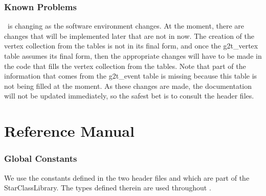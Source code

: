 
\section{Known Problems} 

\StMcEvent\ is changing as the software environment changes.  At the moment,
there are changes that will be implemented later that are not in now.
The creation of the vertex collection from the tables is not in its final
form, and once the g2t\_vertex table assumes its final form, then the appropriate
changes will have to be made in the code that fills the vertex collection from
the tables.  Note that part of the information that comes from the g2t\_event
table is missing because this table is not being filled at the moment.
As these changes are made, the documentation will not be updated immediately, so
the safest bet is to consult the header files.



\clearpage

%
%
\part{Reference Manual}
\label{refman}
\clearpage


\section{Global Constants}

We use the constants defined in the two header files
  and
 which are part of the StarClassLibrary.
The types defined therein are used
throughout \StMcEvent .


